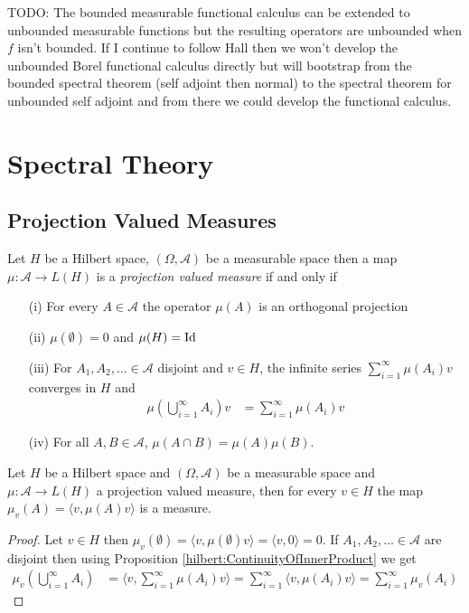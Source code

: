 TODO: The bounded measurable functional calculus can be extended to unbounded measurable functions but the resulting operators are unbounded when $f$ isn't bounded.   If I continue to follow Hall then we won't develop the unbounded Borel functional calculus directly but will bootstrap from the bounded spectral theorem (self adjoint then normal) to the spectral theorem for unbounded self adjoint and from there we could develop the functional calculus.  

\section{Spectral Theory}

\subsection{Projection Valued Measures}

\begin{defn}Let $H$ be a Hilbert space, $(\Omega, \mathcal{A})$ be a measurable space then a map $\mu : \mathcal{A} \to L(H)$ is a 
\emph{projection valued measure} if and only if 
\begin{itemize}
\item[(i)] For every $A \in \mathcal{A}$ the operator $\mu(A)$ is an orthogonal projection
\item[(ii)] $\mu(\emptyset) = 0$ and $\mu(H) = \operatorname*{Id}$
\item[(iii)] For $A_1, A_2, \dots \in \mathcal{A}$ disjoint and $v \in H$, the infinite series $\sum_{i=1}^\infty \mu(A_i)v$ converges in $H$ and 
\begin{align*}
\mu(\bigcup_{i=1}^\infty A_i)  v &= \sum_{i=1}^\infty \mu(A_i)v
\end{align*}
\item[(iv)]For all $A,B \in \mathcal{A}$, $\mu(A \cap B) = \mu(A) \mu(B)$.
\end{itemize}
\end{defn}


\begin{prop}\label{hilbert:PointwiseEvaluationOfProjectionMeasure}Let $H$ be a Hilbert space and $(\Omega, \mathcal{A})$ be a measurable space and $\mu : \mathcal{A} \to L(H)$ a projection valued measure, then
for every $v \in H$ the map $\mu_v(A) = \langle v, \mu(A) v \rangle$ is a measure.
\end{prop}
\begin{proof}
Let $v \in H$ then $\mu_v(\emptyset) = \langle v , \mu(\emptyset) v \rangle = \langle v, 0 \rangle = 0$.  If $A_1, A_2, \dots \in \mathcal{A}$ are disjoint
then using Proposition \ref{hilbert:ContinuityOfInnerProduct} we get
\begin{align*}
\mu_v(\bigcup_{i=1}^\infty A_i) &= \langle v , \sum_{i=1}^\infty \mu(A_i)v \rangle = \sum_{i=1}^\infty \langle v , \mu(A_i)v \rangle = \sum_{i=1}^\infty \mu_v (A_i)
\end{align*}
\end{proof}

